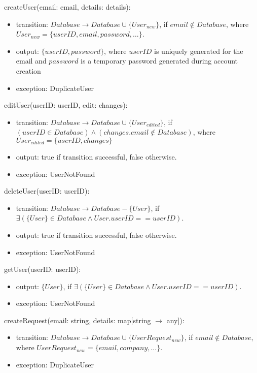\documentclass[12pt, titlepage]{article}
\begin{document}
{  \noindent createUser(email: email, details: details):
  \begin{itemize}
    \item transition: $Database \rightarrow Database \cup
      \{User_{new}\}$, if $email \notin Database$, where $User_{new} =
      \{userID, email, password, \ldots\}$.
    \item output: $\{userID, password\}$, where $userID$ is uniquely
      generated for the email and $password$ is a temporary password
      generated during account creation
    \item exception: DuplicateUser
  \end{itemize}

  \noindent editUser(userID: userID, edit: changes):
  \begin{itemize}
    \item transition: $Database \rightarrow Database \cup
      \{User_{edited}\}$, if $(userID \in Database) \wedge
      (changes.email \notin Database)$, where $User_{edited} =
      \{userID, changes\}$
    \item output: true if transition successful, false otherwise.
    \item exception: UserNotFound
  \end{itemize}

  \noindent deleteUser(userID: userID):
  \begin{itemize}
    \item transition: $Database \rightarrow Database - \{User\}$, if
      $\exists(\{User\} \in Database \wedge User.userID == userID)$.
    \item output: true if transition successful, false otherwise.
    \item exception: UserNotFound
  \end{itemize}

  \noindent getUser(userID: userID):
  \begin{itemize}
    \item output: $\{User\}$, if $\exists(\{User\} \in Database \wedge
      User.userID == userID)$.
    \item exception: UserNotFound
  \end{itemize}

  \noindent createRequest(email: string, details: map[string
  $\rightarrow$ any]):
  \begin{itemize}
    \item transition: $Database \rightarrow Database \cup
      \{UserRequest_{new}\}$, if $email \notin Database$, where
      $UserRequest_{new} =
      \{email, company, \ldots\}$.
    \item exception: DuplicateUser
  \end{itemize}

}
\end{document}
